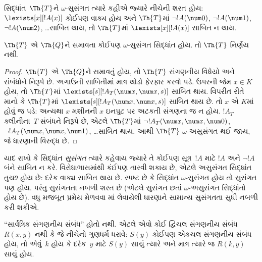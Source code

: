 \begin{defn}
સિદ્ધાંત~$\Th{T}$ને
$\omega$-સુસંગત ત્યારે
કહીએ જ્યારે નીચેની શરત હોય:
$\lexists[x][!A(x)]$ કોઈપણ
વાક્ય હોય અને $\Th{T}$માં
$\lnot !A(\num 0)$,
$\lnot !A(\num 1)$,
$\lnot !A(\num 2)$,
\dots સાબિત થાય, તો
$\Th{T}$માં
$\lexists[x][!A(x)]$
સાબિત ન થાય.
\end{defn}

\begin{thm}
  $\Th{T}$ એ $\Th{Q}$ને
  સમાવતા કોઈપણ
  $\omega$-સુસંગત સિદ્ધાંત
  હોય. તો $\Th{T}$
  નિર્ણેય નથી.
\end{thm}

\begin{proof}
$\Th{T}$ એ $\Th{Q}$ને
સમાવતું હોય, તો
$\Th{T}$ સંગણનીય વિધેયો
અને સંબંધોને નિરૂપે છે.
અગાઉની સાબિતીમાં માત્ર
થોડો ફેરફાર કરવો પડે.
ઉપરની જેમ $x \in K$ હોય,
તો $\Th{T}$માં
$\lexists[s][!A_T(\num
  x,\num x, s)]$ સાબિત થાય.
વિપરીત રીતે માનો કે
$\Th{T}$માં
$\lexists[s][!A_T(\num x, \num x, s)]$
સાબિત થાય છે. તો $x$ એ
$K$માં હોવું જ પડે: અન્યથા
$x$ મશીનની $x$ ઇનપુટ
પર અટકતી સંગણના જ ન હોય.
$!A_T$ ક્લીનીના~$T$
સંબંધને નિરૂપે છે, એટલે
$\Th{T}$માં
$\lnot !A_T(\num x, \num x, \num 0)$,
$\lnot !A_T(\num x, \num
x, \num 1)$, \dots સાબિત
થાય. આથી $\Th{T}$
$\omega$-અસુસંગત થઈ જાય,
જે ધારણાની વિરુદ્ધ છે.
\end{proof}
\endgroup


\begingroup
\makeatletter{}\makeatother


\label{guunit:OLP-0305}


\begin{explain}
યાદ રાખો કે સિદ્ધાંત
\emph{સુસંગત} ત્યારે કહેવાય
જ્યારે તે કોઈપણ
સૂત્ર~$!A$ માટે
$!A$ અને $\lnot !A$
બંને સાબિત ન કરે.
વિરોધાભાસમાંથી કંઈપણ તારવી
શકાય છે, એટલે અસુસંગત
સિદ્ધાંત તુચ્છ હોય છે:
દરેક વાક્ય સાબિત થાય છે.
સ્પષ્ટ છે કે સિદ્ધાંત
$\omega$-સુસંગત હોય તો
સુસંગત પણ હોય. પરંતુ
સુસંગતતા નબળી શરત છે
(એટલે સુસંગત છતાં
$\omega$-અસુસંગત સિદ્ધાંતો
હોય છે). વધુ મજબૂત પ્રમેય
મેળવવા
માં
લેવાયેલી ધારણાને સામાન્ય
સુસંગતતા સુધી નબળી કરી
શકીએ.
\end{explain}

\begin{lem}
``સાર્વત્રિક સંગણનીય સંબંધ''
હોતો નથી. એટલે એવો કોઈ
દ્વિચલ સંગણનીય સંબંધ
$R(x,y)$ નથી કે જે નીચેનો
ગુણધર્મ ધરાવે: $S(y)$
કોઈપણ એકચલ સંગણનીય
સંબંધ હોય, તો એવું~$k$
હોય કે દરેક~$y$ માટે
$S(y)$ સાચું ત્યારે અને
માત્ર ત્યારે જ $R(k,y)$
સાચું હોય.
\end{lem}

